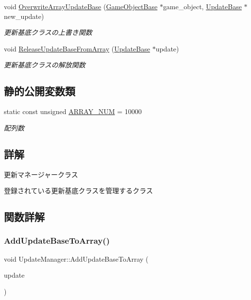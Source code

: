 \begin{DoxyCompactItemize}
void \mbox{\hyperlink{class_update_manager_ab4f492c33ed941ddd01ccae8218080ff}{Overwrite\+Array\+Update\+Base}} (\mbox{\hyperlink{class_game_object_base}{Game\+Object\+Base}} $\ast$game\+\_\+object, \mbox{\hyperlink{class_update_base}{Update\+Base}} $\ast$new\+\_\+update)
\begin{DoxyCompactList}\small\item\em 更新基底クラスの上書き関数 \end{DoxyCompactList}\item 
void \mbox{\hyperlink{class_update_manager_a8a54226896f4280b589af85c07e869d9}{Release\+Update\+Base\+From\+Array}} (\mbox{\hyperlink{class_update_base}{Update\+Base}} $\ast$update)
\begin{DoxyCompactList}\small\item\em 更新基底クラスの解放関数 \end{DoxyCompactList}\end{DoxyCompactItemize}
\subsection*{静的公開変数類}
\begin{DoxyCompactItemize}
\item 
static const unsigned \mbox{\hyperlink{class_update_manager_a280b884fb6a025cfd92d4f93086c60c6}{A\+R\+R\+A\+Y\+\_\+\+N\+UM}} = 10000
\begin{DoxyCompactList}\small\item\em 配列数 \end{DoxyCompactList}\end{DoxyCompactItemize}


\subsection{詳解}
更新マネージャークラス 

登録されている更新基底クラスを管理するクラス 

\subsection{関数詳解}
\mbox{\label{class_update_manager_afe4b39d94cde8294cc273cde32788eaa}} 
\subsubsection{\texorpdfstring{Add\+Update\+Base\+To\+Array()}{AddUpdateBaseToArray()}}
{\footnotesize\ttfamily void Update\+Manager\+::\+Add\+Update\+Base\+To\+Array (\begin{DoxyParamCaption}\item[{\mbox{\hyperlink{class_update_base}{Update\+Base}} $\ast$}]{update }\end{DoxyParamCaption})}



